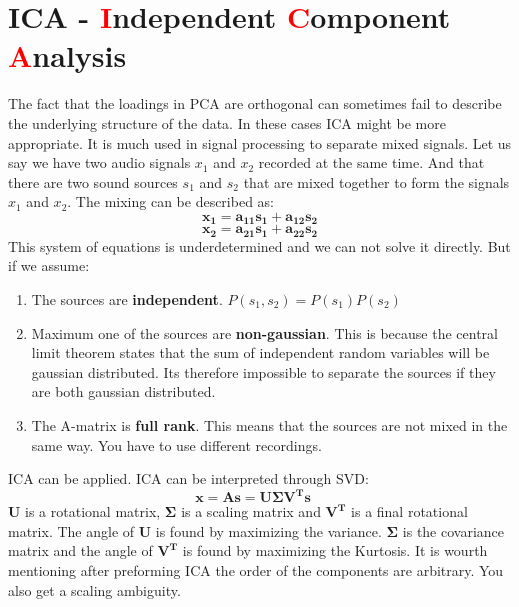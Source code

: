 \section{ICA - \textcolor{red}{I}ndependent \textcolor{red}{C}omponent \textcolor{red}{A}nalysis}
The fact that the loadings in PCA are orthogonal can sometimes fail to describe the underlying structure of the data. In these cases ICA might be more appropriate. It is much used in signal processing to separate mixed signals. Let us say we have two audio signals $x_1$ and $x_2$ recorded at the same time. And that there are two sound sources $s_1$ and $s_2$ that are mixed together to form the signals $x_1$ and $x_2$. The mixing can be described as:
\begin{equation}
    \mathbf{
    x_1 = a_{11}s_1 + a_{12}s_2 
    }
\end{equation}
\begin{equation}
    \mathbf{
    x_2 = a_{21}s_1 + a_{22}s_2
    }
\end{equation}
This system of equations is underdetermined and we can not solve it directly. But if we assume:
\begin{enumerate}
    \item The sources are \textbf{independent}. $P(s_1,s_2) = P(s_1)P(s_2)$
    \item Maximum one of the sources are \textbf{non-gaussian}. This is because the central limit theorem states that the sum of independent random variables will be gaussian distributed. Its therefore impossible to separate the sources if they are both gaussian distributed.
    \item The A-matrix is \textbf{full rank}. This means that the sources are not mixed in the same way. You have to use different recordings.
\end{enumerate}
ICA can be applied. ICA can be interpreted through SVD:
\begin{equation}
    \mathbf{
    x = As  =  U\Sigma V^Ts \quad
    }
\end{equation}
$\mathbf{U}$ is a rotational matrix, $\mathbf{\Sigma}$ is a scaling matrix and $\mathbf{V^T}$ is a final rotational matrix. The angle of $\mathbf{U}$ is found by maximizing the variance. $\mathbf{\Sigma}$ is the covariance matrix and the angle of $\mathbf{V^T}$ is found by maximizing the Kurtosis. \newline \newline
It is wourth mentioning after preforming ICA the order of the components are arbitrary. You also get a scaling ambiguity. \newline


